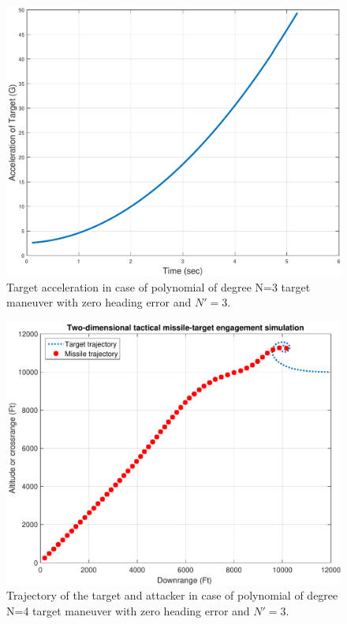 \begin{figure}[H]
	\centering
	\includegraphics[scale = 0.55]{fig/TargetAccelerationP3N3.pdf}
	\caption{Target acceleration in case of  polynomial of degree N=3 target maneuver with zero heading error and $N'=3$.}
	\label{Target accelerationP3N3}
\end{figure}

\begin{figure}[htb]
	\centering
	\includegraphics[scale = 0.35]{fig/trajectoryP4N3.pdf}
	\caption{Trajectory of the target and attacker in case of  polynomial of degree N=4 target maneuver with zero heading error and $N'=3$.}
	\label{trajectoryP4}
\end{figure}


